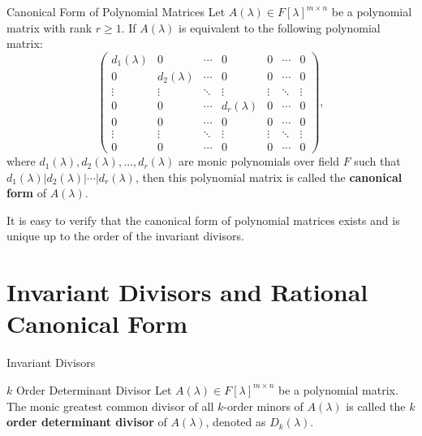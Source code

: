 \documentclass[11pt]{../../TexTemplate/elegantbook} %
\begin{document}
\begin{definition}{Canonical Form of Polynomial Matrices}
    Let \( A(\lambda) \in F[\lambda]^{m \times n} \) be a polynomial matrix with rank \( r \geqslant 1 \).
    If \( A(\lambda) \) is equivalent to the following polynomial matrix:
    \[
    \begin{pmatrix}
        d_1(\lambda) & 0 & \cdots & 0 & 0 & \cdots & 0 \\
        0 & d_2(\lambda) & \cdots & 0 & 0 & \cdots & 0 \\
        \vdots & \vdots & \ddots & \vdots & \vdots & \ddots & \vdots \\
        0 & 0 & \cdots & d_r(\lambda) & 0 & \cdots & 0 \\
        0 & 0 & \cdots & 0 & 0 & \cdots & 0 \\
        \vdots & \vdots & \ddots & \vdots & \vdots & \ddots & \vdots \\
        0 & 0 & \cdots & 0 & 0 & \cdots & 0
    \end{pmatrix},
    \]
    where \( d_1(\lambda), d_2(\lambda), \dots, d_r(\lambda) \) are monic polynomials over field \( F \)
    such that \( d_1(\lambda) | d_2(\lambda) | \cdots | d_r(\lambda) \),
    then this polynomial matrix is called the \textbf{canonical form} of \( A(\lambda) \).
\end{definition}
It is easy to verify that the canonical form of polynomial matrices exists and is unique up to the order of the invariant divisors.


\section{Invariant Divisors and Rational Canonical Form}
\begin{leftbarTitle}{Invariant Divisors}\end{leftbarTitle}
\begin{definition}{\(k\) Order Determinant Divisor}
    Let \( A(\lambda) \in F[\lambda]^{m \times n} \) be a polynomial matrix.
    The monic greatest common divisor of all \( k \)-order minors of \( A(\lambda) \) 
    is called the \textbf{\( k \) order determinant divisor} of \( A(\lambda) \),
    denoted as \( D_k(\lambda) \).
\end{definition}
\end{document}
